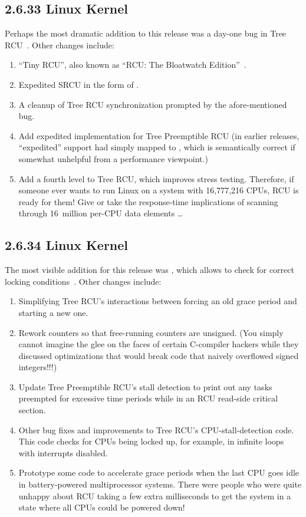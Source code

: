 \subsection{2.6.33 Linux Kernel}

Perhaps the most dramatic addition to this release was
a day-one bug in Tree RCU~\cite{PaulEMcKenney2009HuntingHeisenbugs}.
Other changes include:

\begin{enumerate}
\item	``Tiny RCU'', also known as ``RCU: The Bloatwatch
	Edition''~\cite{PaulEMcKenney2009LWNBloatWatchRCU}.
\item	Expedited SRCU in the form of
	.
\item	A cleanup of Tree RCU synchronization prompted by the
	afore-mentioned bug.
\item	Add expedited implementation for Tree Preemptible RCU
	(in earlier releases, ``expedited'' support had simply
	mapped to , which is semantically
	correct if somewhat unhelpful from a performance viewpoint.)
\item	Add a fourth level to Tree RCU, which improves stress testing.
	Therefore, if someone ever wants to run Linux on a system with
	16,777,216 CPUs, RCU is ready for them!
	Give or take the response-time implications of scanning
	through 16~million per-CPU data elements \ldots
\end{enumerate}

\subsection{2.6.34 Linux Kernel}

The most visible addition for this release was ,
which allows  to check for correct locking
conditions~\cite{PaulEMcKenney2010LockdepRCU}.
Other changes include:

\begin{enumerate}
\item	Simplifying Tree RCU's interactions between
	forcing an old grace period and starting a new one.
\item	Rework counters so that free-running counters are unsigned.
	(You simply cannot imagine the glee on the faces of certain
	C-compiler hackers while they discussed optimizations that would
	break code that naively overflowed signed integers!!!)
\item	Update Tree Preemptible RCU's stall detection to print out
	any tasks preempted for excessive time periods while in
	an RCU read-side critical section.
\item	Other bug fixes and improvements to Tree RCU's CPU-stall-detection
	code.
	This code checks for CPUs being locked up, for example,
	in infinite loops with interrupts disabled.
\item	Prototype some code to accelerate grace periods when the
	last CPU goes idle in battery-powered multiprocessor
	systems.
	There were people who were quite unhappy about RCU taking
	a few extra milliseconds to get the system in a state
	where all CPUs could be powered down!
\end{enumerate}

